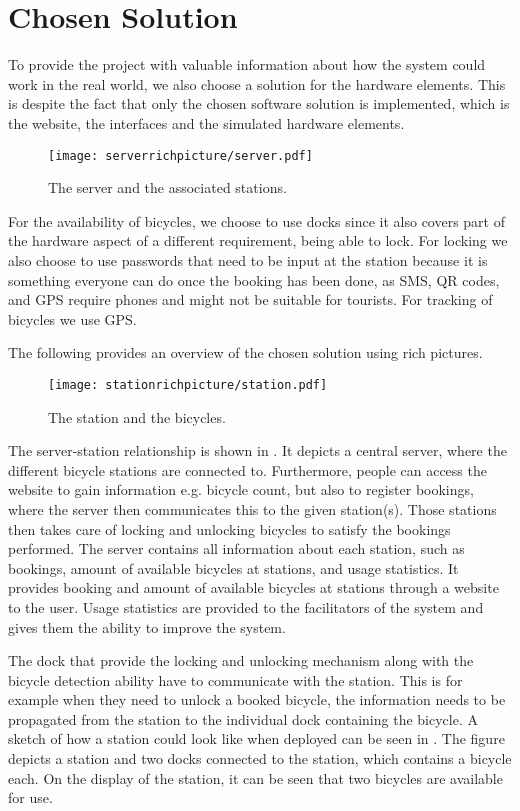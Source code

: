 \section{Chosen Solution}
To provide the project with valuable information about how the system could work in the real world, we also choose a solution for the hardware elements.
This is despite the fact that only the chosen software solution is implemented, which is the website, the interfaces and the simulated hardware elements.

\begin{figure}[h]
\centering
\texttt{[image: serverrichpicture/server.pdf]}
\caption{The server and the associated stations.}
\label{fig:ServerRichPicture}
\end{figure}

For the availability of bicycles, we choose to use docks since it also covers part of the hardware aspect of a different requirement, being able to lock.  
For locking we also choose to use passwords that need to be input at the station because it is something everyone can do once the booking has been done, as SMS, QR codes, and GPS require phones and might not be suitable for tourists.
For tracking of bicycles we use GPS.

The following provides an overview of the chosen solution using rich pictures.

\begin{figure}[h]
\centering
\texttt{[image: stationrichpicture/station.pdf]}
\caption{The station and the bicycles.}
\label{fig:StationRichPicture}
\end{figure}

The server-station relationship is shown in .
It depicts a central server, where the different bicycle stations are connected to.
Furthermore, people can access the website to gain information e.g. bicycle count, but also to register bookings, where the server then communicates this to the given station(s).
Those stations then takes care of locking and unlocking bicycles to satisfy the bookings performed.
The server contains all information about each station, such as bookings, amount of available bicycles at stations, and usage statistics.
It provides booking and amount of available bicycles at stations through a website to the user. 
Usage statistics are provided to the facilitators of the system and gives them the ability to improve the system. 



The dock that provide the locking and unlocking mechanism along with the bicycle detection ability have to communicate with the station. 
This is for example when they need to unlock a booked bicycle, the information needs to be propagated from the station to the individual dock containing the bicycle.
A sketch of how a station could look like when deployed can be seen in .
The figure depicts a station and two docks connected to the station, which contains a bicycle each. 
On the display of the station, it can be seen that two bicycles are available for use.
